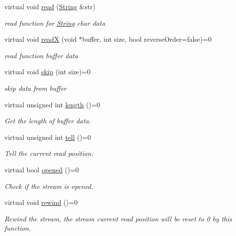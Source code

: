\begin{DoxyCompactItemize}
virtual void \hyperlink{class_i_dream_sky_1_1_input_stream_a953c23b6d7d9731d23c4bcdcccb2061b}{read} (\hyperlink{class_i_dream_sky_1_1_string}{String} \&str)
\begin{DoxyCompactList}\small\item\em read function for \hyperlink{class_i_dream_sky_1_1_string}{String} char data \end{DoxyCompactList}\item 
virtual void \hyperlink{class_i_dream_sky_1_1_input_stream_abf84dc5067f961cbeb37b161c3a893b2}{readX} (void $\ast$buffer, int size, bool reverse\+Order=false)=0
\begin{DoxyCompactList}\small\item\em read function buffer data \end{DoxyCompactList}\item 
virtual void \hyperlink{class_i_dream_sky_1_1_input_stream_a6fcef9f3c1151ade30c65176ce63aa67}{skip} (int size)=0
\begin{DoxyCompactList}\small\item\em skip data from buffer \end{DoxyCompactList}\item 
virtual unsigned int \hyperlink{class_i_dream_sky_1_1_input_stream_a1d91c05358c6bba4df7e5e8f4743527b}{length} ()=0
\begin{DoxyCompactList}\small\item\em Get the length of buffer data. \end{DoxyCompactList}\item 
virtual unsigned int \hyperlink{class_i_dream_sky_1_1_input_stream_a74fc176bbbae124cc2a0a60c40d7efc1}{tell} ()=0
\begin{DoxyCompactList}\small\item\em Tell the current read position. \end{DoxyCompactList}\item 
virtual bool \hyperlink{class_i_dream_sky_1_1_input_stream_aa80c55fc4a4470e0cead401c362c4edf}{opened} ()=0
\begin{DoxyCompactList}\small\item\em Check if the stream is opened. \end{DoxyCompactList}\item 
virtual void \hyperlink{class_i_dream_sky_1_1_input_stream_a74956c76a2534d26dfd9c115d3910b77}{rewind} ()=0
\begin{DoxyCompactList}\small\item\em Rewind the stream, the stream current read position will be reset to 0 by this function. \end{DoxyCompactList}\end{DoxyCompactItemize}
